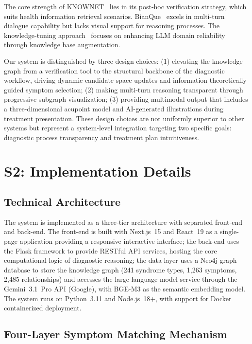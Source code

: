 \documentclass[12pt]{article}
\begin{document}
The core strength of KNOWNET~\cite{35} lies in its post-hoc verification strategy, which suits health information retrieval scenarios. BianQue~\cite{61} excels in multi-turn dialogue capability but lacks visual support for reasoning processes. The knowledge-tuning approach~\cite{60} focuses on enhancing LLM domain reliability through knowledge base augmentation.

Our system is distinguished by three design choices: (1) elevating the knowledge graph from a verification tool to the structural backbone of the diagnostic workflow, driving dynamic candidate space updates and information-theoretically guided symptom selection; (2) making multi-turn reasoning transparent through progressive subgraph visualization; (3) providing multimodal output that includes a three-dimensional acupoint model and AI-generated illustrations during treatment presentation. These design choices are not uniformly superior to other systems but represent a system-level integration targeting two specific goals: diagnostic process transparency and treatment plan intuitiveness.

\section{S2: Implementation Details}
\label{sec:si-implementation}

\subsection{Technical Architecture}\label{subsec:tech-arch}

The system is implemented as a three-tier architecture with separated front-end and back-end. The front-end is built with Next.js~15 and React~19 as a single-page application providing a responsive interactive interface; the back-end uses the Flask framework to provide RESTful API services, hosting the core computational logic of diagnostic reasoning; the data layer uses a Neo4j graph database to store the knowledge graph (241 syndrome types, 1,263 symptoms, 2,485 relationships) and accesses the large language model service through the Gemini~3.1~Pro API (Google), with BGE-M3 as the semantic embedding model. The system runs on Python~3.11 and Node.js~18+, with support for Docker containerized deployment.

\subsection{Four-Layer Symptom Matching Mechanism}\label{subsec:symptom-matching}
\end{document}

